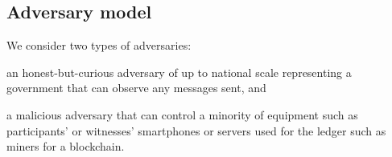 


\subsection{Adversary model}
\label{adversary-model}

We consider two types of adversaries: \begin{enumerate*} \item an honest-but-curious adversary
of up to national scale representing a government that can observe any
messages sent, and \item a malicious adversary that can control a
minority of 
equipment such as participants' or witnesses' smartphones or servers
used for the ledger such as miners for a blockchain. \end{enumerate*}
